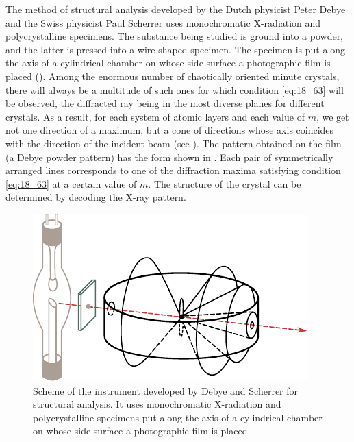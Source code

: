The method of structural analysis developed by the Dutch physicist Peter Debye and the Swiss physicist Paul Scherrer uses monochromatic X-radiation and polycrystalline specimens.
The substance being studied is ground into a powder, and the latter is pressed into a wire-shaped specimen.
The specimen is put along the axis of a cylindrical chamber on whose side surface a photographic film is placed ().
Among the enormous number of chaotically oriented minute crystals, there will always be a multitude of such ones for which condition \eqref{eq:18_63} will be observed, the diffracted ray being in the most diverse planes for different crystals.
As a result, for each system of atomic layers and each value of $m$, we get not one direction of a maximum, but a cone of directions whose axis
coincides with the direction of the incident beam (see ).
The pattern obtained on the film (a Debye powder pattern) has the form shown in .
Each pair of symmetrically arranged lines corresponds to one of the diffraction maxima satisfying condition \eqref{eq:18_63} at a certain value of $m$.
The structure of the crystal can be determined by decoding the X-ray pattern.

\begin{figure}[t]
	\begin{center}
		\includegraphics[scale=1.0]{figures/ch_18/fig_18_45.pdf}
        \caption[]{Scheme of the instrument developed by Debye and Scherrer for structural analysis. It uses monochromatic X-radiation and polycrystalline specimens put along the axis of a cylindrical chamber on whose side surface a photographic film is placed.}
		\label{fig:18_45}
	\end{center}
	\vspace{-0.2cm}
\end{figure}


